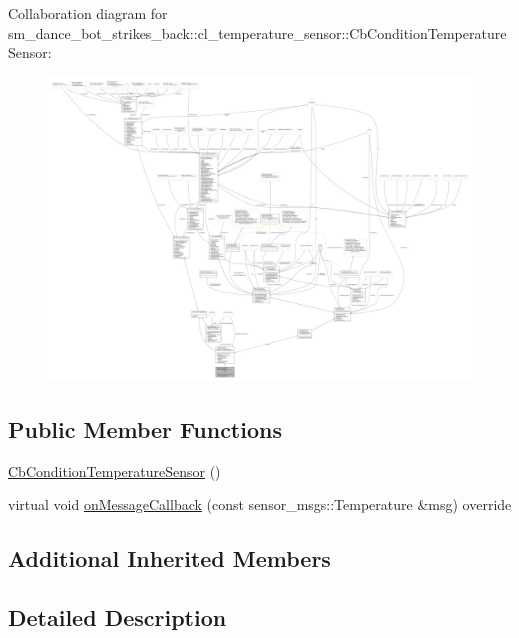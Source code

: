 Collaboration diagram for sm\+\_\+dance\+\_\+bot\+\_\+strikes\+\_\+back\+:\+:cl\+\_\+temperature\+\_\+sensor\+:\+:Cb\+Condition\+Temperature\+Sensor\+:
\nopagebreak
\begin{figure}[H]
\begin{center}
\leavevmode
\includegraphics[width=350pt]{classsm__dance__bot__strikes__back_1_1cl__temperature__sensor_1_1CbConditionTemperatureSensor__coll__graph}
\end{center}
\end{figure}
\subsection*{Public Member Functions}
\begin{DoxyCompactItemize}
\item 
\hyperlink{classsm__dance__bot__strikes__back_1_1cl__temperature__sensor_1_1CbConditionTemperatureSensor_acf7ebd3cd85fcf8fba9e5e3c3bd7bc83}{Cb\+Condition\+Temperature\+Sensor} ()
\item 
virtual void \hyperlink{classsm__dance__bot__strikes__back_1_1cl__temperature__sensor_1_1CbConditionTemperatureSensor_a98012d6a2c5469fb95990e726d87d98d}{on\+Message\+Callback} (const sensor\+\_\+msgs\+::\+Temperature \&msg) override
\end{DoxyCompactItemize}
\subsection*{Additional Inherited Members}


\subsection{Detailed Description}


